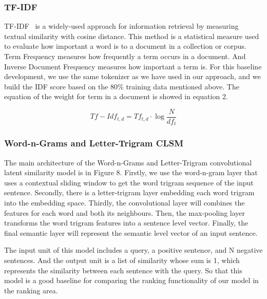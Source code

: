 \subsubsection{TF-IDF}
TF-IDF~\cite{??} is a widely-used approach for information retrieval by measuring textual similarity with cosine distance. 
This method is a statistical measure used to evaluate how important a word is to a document in a collection or corpus. 
Term Frequency measures how frequently a term occurs in a document. 
And Inverse Document Frequency measures how important a term is. 
For this baseline development, we use the same tokenizer as we have used in our approach, and we build the IDF score based on the 80\% training data mentioned above.
The equation of the weight for term in a document is showed in equation 2.\par
\begin{normalsize}
	\begin{equation}
	Tf-Idf_{t,d} = Tf_{t,d} \cdot \log \frac{N}{df_t}
	\end{equation}
\end{normalsize}


\subsubsection{Word-n-Grams and Letter-Trigram CLSM}
The main architecture of the Word-n-Grams and Letter-Trigram convolutional latent similarity model is in Figure 8. Firstly, we use the word-n-gram layer that uses a contextual sliding window to get the word trigram sequence of the input sentence. Secondly, there is a letter-trigram layer embedding each word trigram into the embedding space. Thirdly, the convolutional layer will combines the features for each word and both its neighbours. Then, the max-pooling layer transforms the word trigram features into a sentence level vector. Finally, the final semantic layer will represent the semantic level vector of an input sentence.  \par
The input unit of this model includes a query, a positive sentence, and N negative sentences. And the output unit is a list of similarity whose sum is 1, which represents the similarity between each sentence with the query. So that this model is a good baseline for comparing the ranking functionality of our model in the ranking area.


